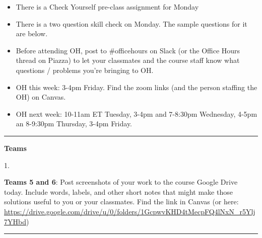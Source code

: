 \documentclass[12pt,letterpaper,noanswers]{exam}
\begin{document}
 \pdfpageheight 11in 
  \pdfpagewidth 8.5in

\noindent 
\begin{itemize}
\itemsep0em
    \item There is a Check Yourself pre-class assignment for Monday
    \item There is a two question skill check on Monday.  The sample questions for it are below.
    \item Before attending OH, post to \#officehours on Slack (or the Office Hours thread on Piazza) to let your classmates and the course staff know what questions / problems you're bringing to OH.
    \item OH this week: 3-4pm Friday.  Find the zoom links (and the person staffing the OH) on Canvas.
    \item OH next week: 10-11am ET Tuesday, 3-4pm and 7-8:30pm Wednesday, 4-5pm an 8-9:30pm Thursday, 3-4pm Friday.
    \end{itemize}

\hrule
\vspace{0.2cm}

\noindent\textbf{Teams}

\begin{multicols}{2}
1. 
\end{multicols}

\noindent \textbf{Teams 5 and 6}: Post screenshots of your work to the course Google Drive today.  Include words, labels, and other short notes that might make those solutions useful to you or your classmates.  Find the link in Canvas (or here: \url{https://drive.google.com/drive/u/0/folders/1GcpwvKHD4tMecpFQ4lNxN_r5Ylj7YHbd})

\vspace{0.2cm}
\hrule
\vspace{0.2cm}
\end{document}
